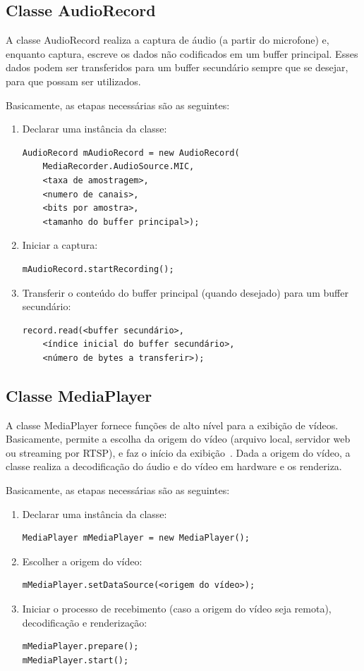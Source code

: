 \documentclass{acm_proc_article-sp}
\begin{document}
\subsection{Classe AudioRecord}
A classe AudioRecord realiza a captura de áudio (a partir do microfone) e, enquanto captura, escreve os dados não codificados em um buffer principal. Esses dados podem ser transferidos para um buffer secundário sempre que se desejar, para que possam ser utilizados.

Basicamente, as etapas necessárias são as seguintes:
\begin{enumerate}
 \item Declarar uma instância da classe:
  \begin{verbatim}
AudioRecord mAudioRecord = new AudioRecord(
    MediaRecorder.AudioSource.MIC, 
    <taxa de amostragem>,
    <numero de canais>,
    <bits por amostra>,
    <tamanho do buffer principal>);
  \end{verbatim}
 \item Iniciar a captura:
  \begin{verbatim}
mAudioRecord.startRecording();
  \end{verbatim}
 \item Transferir o conteúdo do buffer principal (quando desejado) para um buffer secundário:
  \begin{verbatim}
record.read(<buffer secundário>,
    <índice inicial do buffer secundário>,
    <número de bytes a transferir>);
  \end{verbatim}
\end{enumerate}

\subsection{Classe MediaPlayer}
A classe MediaPlayer fornece funções de alto nível para a exibição de vídeos. Basicamente, permite a escolha da origem do vídeo (arquivo local, servidor web ou streaming por RTSP), e faz o início da exibição~\cite{pro_android}. Dada a origem do vídeo, a classe realiza a decodificação do áudio e do vídeo em hardware e os renderiza.

Basicamente, as etapas necessárias são as seguintes:
\begin{enumerate}
 \item Declarar uma instância da classe:
  \begin{verbatim}
MediaPlayer mMediaPlayer = new MediaPlayer();
  \end{verbatim}
 \item Escolher a origem do vídeo:
  \begin{verbatim}
mMediaPlayer.setDataSource(<origem do vídeo>);
  \end{verbatim}
 \item Iniciar o processo de recebimento (caso a origem do vídeo seja remota), decodificação e renderização:
  \begin{verbatim}
mMediaPlayer.prepare();
mMediaPlayer.start();
  \end{verbatim}
\end{enumerate}
\end{document}
